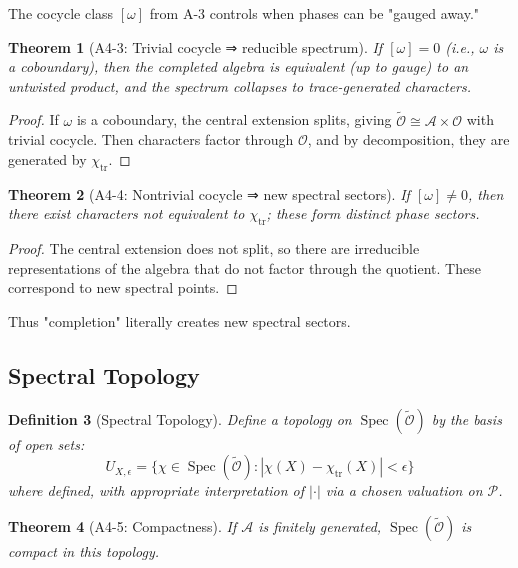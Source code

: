 \documentclass[12pt, oneside]{article}
\newtheorem{theorem}{Theorem}[section]
\newtheorem{definition}[theorem]{Definition}
\DeclareMathOperator{\tr}{tr}
\DeclareMathOperator{\Spec}{Spec}
\newcommand{\A}{\mathcal{A}}
\newcommand{\Opr}{\mathcal{O}}
\newcommand{\wtilde}{\widetilde}
\begin{document}
The cocycle class $[\omega]$ from A-3 controls when phases can be "gauged away."

\begin{theorem}[A4-3: Trivial cocycle ⇒ reducible spectrum]
If $[\omega] = 0$ (i.e., $\omega$ is a coboundary), then the completed algebra is equivalent (up to gauge) to an untwisted product, and the spectrum collapses to trace-generated characters.
\end{theorem}

\begin{proof}
If $\omega$ is a coboundary, the central extension splits, giving $\wtilde{\Opr} \cong \A \times \Opr$ with trivial cocycle. Then characters factor through $\Opr$, and by decomposition, they are generated by $\chi_{\tr}$.
\end{proof}

\begin{theorem}[A4-4: Nontrivial cocycle ⇒ new spectral sectors]
If $[\omega] \neq 0$, then there exist characters not equivalent to $\chi_{\tr}$; these form distinct phase sectors.
\end{theorem}

\begin{proof}
The central extension does not split, so there are irreducible representations of the algebra that do not factor through the quotient. These correspond to new spectral points.
\end{proof}

Thus "completion" literally creates new spectral sectors.

\subsection{Spectral Topology}

\begin{definition}[Spectral Topology]
Define a topology on $\Spec(\wtilde{\Opr})$ by the basis of open sets:
\begin{equation}
U_{X,\epsilon} = \{ \chi \in \Spec(\wtilde{\Opr}) : |\chi(X) - \chi_{\tr}(X)| < \epsilon \}
\end{equation}
where defined, with appropriate interpretation of $|\cdot|$ via a chosen valuation on $\mathcal{P}$.
\end{definition}

\begin{theorem}[A4-5: Compactness]
If $\A$ is finitely generated, $\Spec(\wtilde{\Opr})$ is compact in this topology.
\end{theorem}
\end{document}
